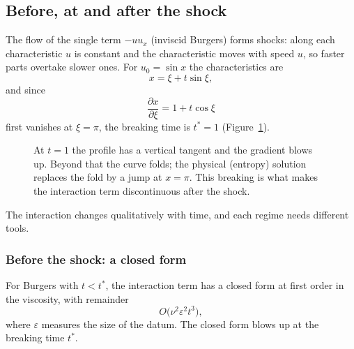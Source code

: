 \subsection{Before, at and after the shock}

The flow of the single term $-uu_x$ (inviscid Burgers) forms shocks: along each characteristic $u$ is constant and the characteristic moves with speed $u$, so faster parts overtake slower ones. For $u_0=\sin x$ the characteristics are
\[
x=\xi+t\sin\xi,
\]
and since
\[
\frac{\partial x}{\partial\xi}=1+t\cos\xi
\]
first vanishes at $\xi=\pi$, the breaking time is $t^*=1$ (Figure~\ref{f:fig:burgers}).

\begin{figure}[!htb]
\centering
{}
\caption{At $t=1$ the profile has a vertical tangent and the gradient blows up. Beyond that the curve folds; the physical (entropy) solution replaces the fold by a jump at $x=\pi$. This breaking is what makes the interaction term discontinuous after the shock.}\label{f:fig:burgers}
\end{figure}

The interaction changes qualitatively with time, and each regime needs different tools.

\subsubsection{Before the shock: a closed form}

\begin{theorem}\label{thm:preshock}
For Burgers with $t<t^*$, the interaction term has a closed form at first order in the viscosity, with remainder
\[
O\big(\nu^2\varepsilon^2t^3\big),
\]
where $\varepsilon$ measures the size of the datum. The closed form blows up at the breaking time $t^*$.

\end{theorem}

